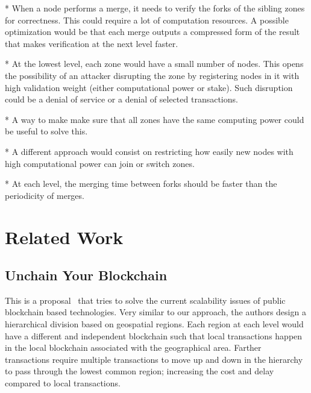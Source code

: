 * When a node performs a merge, it needs to verify the forks of the sibling
zones for correctness.  This could require a lot of computation resources.  A
possible optimization would be that each merge outputs a compressed form of the
result that makes verification at the next level faster.

* At the lowest level, each zone would have a small number of nodes.  This
opens the possibility of an attacker disrupting the zone by registering nodes
in it with high validation weight (either computational power or stake).  Such
disruption could be a denial of service or a denial of selected transactions.

* A way to make make sure that all zones have the same computing power could be
useful to solve this.

* A different approach would consist on restricting how easily new nodes with
high computational power can join or switch zones.

* At each level, the merging time between forks should be faster than the
periodicity of merges.

\section{Related Work}

\subsection{Unchain Your Blockchain}

This is a proposal~\cite{unchain} that tries to solve the current scalability
issues of public blockchain based technologies.  Very similar to our approach,
the authors design a hierarchical division based on geospatial regions.  Each
region at each level would have a different and independent blockchain such
that local transactions happen in the local blockchain associated with the
geographical area.  Farther transactions require multiple transactions to move
up and down in the hierarchy to pass through the lowest common region;
increasing the cost and delay compared to local transactions.


